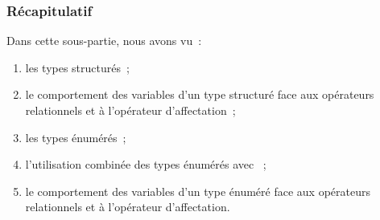 \begin{frame}[fragile] \frametitle{Récapitulatif}
Dans cette sous-partie, nous avons vu~:

\begin{enumerate}
    \item les types structurés~;
    \smallskip

    \item le comportement des variables d'un type structuré face
    aux opérateurs relationnels et à l'opérateur d'affectation~;
    \smallskip

    \item les types énumérés~;
    \smallskip

    \item l'utilisation combinée des types énumérés avec ~;
    \smallskip

    \item le comportement des variables d'un type énuméré face
    aux opérateurs relationnels et à l'opérateur d'affectation.
\end{enumerate}
\end{frame}
